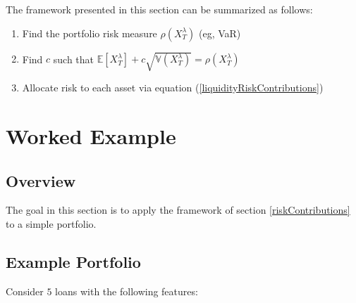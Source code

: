 \documentclass[12pt]{article}
\theoremstyle{definition}
\begin{document}







The framework presented in this section can be summarized as follows:
\begin{enumerate}
\item Find the portfolio risk measure \(\rho(X_T ^\lambda)\) (eg, VaR)
\item Find \(c\) such that \(\mathbb{E}\left[X_T ^ \lambda\right]+c \sqrt{\mathbb{V}(X_T ^ \lambda)}=\rho(X_T ^ \lambda)\)
\item Allocate risk to each asset via equation (\ref{liquidityRiskContributions})
\end{enumerate}


\section{Worked Example}
\subsection{Overview}

The goal in this section is to apply the framework of section \ref{riskContributions} to a simple portfolio.  

\subsection{Example Portfolio}
Consider \(5\) loans with the following features:
\end{document}
